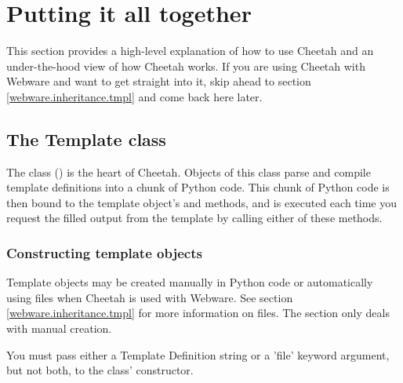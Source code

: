 \section{Putting it all together}
\label{puttingItTogether}

This section provides a high-level explanation of how to use Cheetah and an
under-the-hood view of how Cheetah works.  If you are using Cheetah with Webware
and want to get straight into it, skip ahead to section
\ref{webware.inheritance.tmpl} and come back here later.

\subsection{The Template class}
\label{puttingItTogether.template}

The  class () is the heart of
Cheetah.  Objects of this class parse and compile template definitions into a
chunk of Python code.  This chunk of Python code is then bound to the template
object's  and  methods, and is executed each
time you request the filled output from the template by calling either of these
methods.  

\subsubsection{Constructing template objects}
\label{puttingItTogether.template.constructing}

Template objects may be created manually in Python code or automatically using
 files when Cheetah is used with Webware. See section
\ref{webware.inheritance.tmpl} for more information on  files.  The
section only deals with manual creation.

You must pass either a Template Definition string or a 'file' keyword argument,
but not both, to the  class' constructor.

